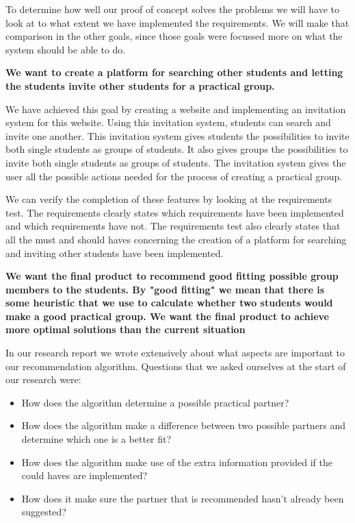 To determine how well our proof of concept solves the problems we will have to look at to what extent we have implemented the requirements.
We will make that comparison in the other goals, since those goals were focussed  more on what the system should be able to do.

\textbf{We want to create a platform for searching other students and letting the students invite other students for a practical group.}

We have achieved this goal by creating a website and implementing an invitation system for this website.
Using this invitation system, students can search and invite one another.
This invitation system gives students the possibilities to invite both single students as groups of students.
It also gives groups the possibilities to invite both single students as groups of students.
The invitation system gives the user all the possible actions needed for the process of creating a practical group.

We can verify the completion of these features by looking at the requirements test.
The requirements clearly states which requirements have been implemented and which requirements have not.
The requirements test also clearly states that all the must and should haves concerning the creation of a platform for searching and inviting other students have been implemented.

\textbf{We want the final product to recommend good fitting possible group members to the students.
By "good fitting" we mean that there is some heuristic that we use to calculate whether two students would make a good practical group.
We want the final product to achieve more optimal solutions than the current situation}

In our research report we wrote extensively about what aspects are important to our recommendation algorithm.
Questions that we asked ourselves at the start of our research were:
\begin{itemize}
\item How does the algorithm determine a possible practical partner?
\item How does the algorithm make a difference between two possible partners and determine which one is a better fit?
\item How does the algorithm make use of the extra information provided if the could haves are implemented?
\item How does it make sure the partner that is recommended hasn't already been suggested?
\end{itemize}

